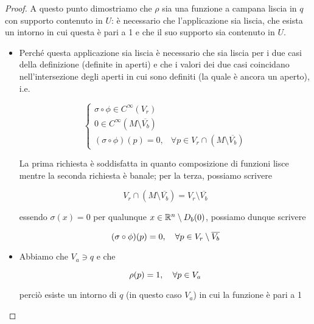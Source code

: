 \begin{proof}
	A questo punto dimostriamo che $ \rho $ sia una funzione a campana liscia in $ q $ con supporto contenuto in $ U $: è necessario che l'applicazione sia liscia, che esista un intorno in cui questa è pari a 1 e che il suo supporto sia contenuto in $ U $.
	
	\begin{itemize}
		\item Perché questa applicazione sia liscia è necessario che sia liscia per i due casi della definizione (definite in aperti) e che i valori dei due casi coincidano nell'intersezione degli aperti in cui sono definiti (la quale è ancora un aperto), i.e.
		
		\begin{equation}
			\begin{cases}
				\sigma \circ \phi \in C^{\infty}(V_{r})\\
				0 \in C^{\infty} \left( M \setminus \overline{V_{b}} \right)\\
				(\sigma \circ \phi)(p) = 0, & \forall p \in V_{r} \cap (M \setminus \overline{V_{b}})
			\end{cases}
		\end{equation}
		
		La prima richiesta è soddisfatta in quanto composizione di funzioni lisce mentre la seconda richiesta è banale; per la terza, possiamo scrivere
		
		\begin{equation}
			V_{r} \cap \left( M \setminus \overline{V_{b}} \right) = V_{r} \setminus \overline{V_{b}}
		\end{equation}
		
		essendo $ \sigma(x) = 0 $ per qualunque $ x \in \mathbb{R}^{n} \setminus D_{b}(0) $, possiamo dunque scrivere
		
		\begin{equation}
			(\sigma \circ \phi)(p) = 0 \qcomma \forall p \in V_{r} \setminus \overline{V_{b}}
		\end{equation}
		
		
		\item Abbiamo che $ V_{a} \ni q $ e che
		
		\begin{equation}
			\rho(p) = 1 \qcomma \forall p \in V_{a}
		\end{equation}
	
		perciò esiste un intorno di $ q $ (in questo caso $ V_{a} $) in cui la funzione è pari a 1
		
		

\end{itemize}
\end{proof}
